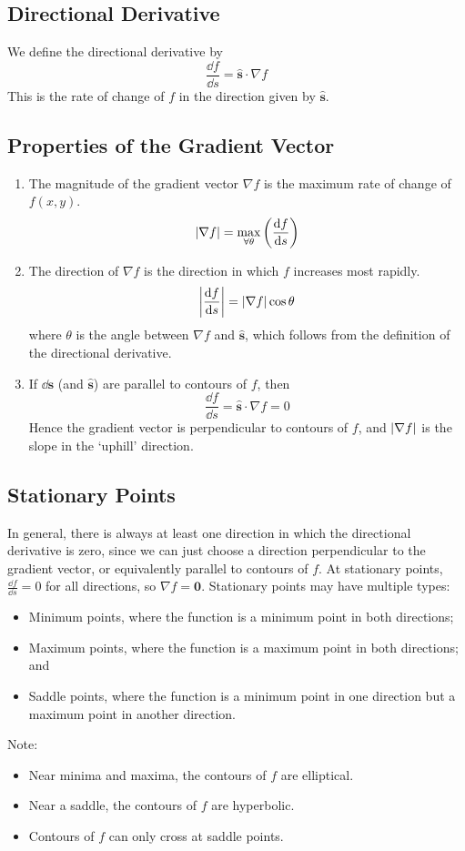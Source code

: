 \documentclass{article}
\begin{document}
\subsection{Directional Derivative}
We define the directional derivative by
\[ \frac{\dd f}{\dd s} = \hat{\bm s} \cdot \nabla f \]
This is the rate of change of $f$ in the direction given by $\hat{\bm s}$.

\subsection{Properties of the Gradient Vector}
\begin{enumerate}
	\item The magnitude of the gradient vector $\nabla f$ is the maximum rate of change of $f(x, y)$.
	      \[ \abs{\nabla f} = \max\limits_{\forall \theta} \left( \frac{\dd f}{\dd s} \right) \]
	\item The direction of $\nabla f$ is the direction in which $f$ increases most rapidly.
	      \[ \abs{\frac{\dd f}{\dd s}} = \abs{\nabla f}\cos\theta \]
	      where $\theta$ is the angle between $\nabla f$ and $\hat{\bm s}$, which follows from the definition of the directional derivative.
	\item If $\dd \bm s$ (and $\hat{\bm s}$) are parallel to contours of $f$, then
	      \[ \frac{\dd f}{\dd s} = \hat{\bm s} \cdot \nabla f = 0 \]
	      Hence the gradient vector is perpendicular to contours of $f$, and $\abs{\nabla f}$ is the slope in the `uphill' direction.
\end{enumerate}

\subsection{Stationary Points}
In general, there is always at least one direction in which the directional derivative is zero, since we can just choose a direction perpendicular to the gradient vector, or equivalently parallel to contours of $f$. At stationary points, $\frac{\dd f}{\dd s} = 0$ for all directions, so $\nabla f = \bm 0$. Stationary points may have multiple types:
\begin{itemize}
	\item Minimum points, where the function is a minimum point in both directions;
	\item Maximum points, where the function is a maximum point in both directions; and
	\item Saddle points, where the function is a minimum point in one direction but a maximum point in another direction.
\end{itemize}
Note:
\begin{itemize}
	\item Near minima and maxima, the contours of $f$ are elliptical.
	\item Near a saddle, the contours of $f$ are hyperbolic.
	\item Contours of $f$ can only cross at saddle points.
\end{itemize}
\end{document}
